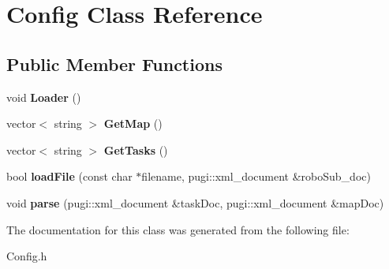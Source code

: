 \hypertarget{classConfig}{\section{\-Config \-Class \-Reference}
\label{classConfig}
}
\subsection*{\-Public \-Member \-Functions}
\begin{DoxyCompactItemize}
\item 
\hypertarget{classConfig_acb243f0e74640367bc098a4d5801cbf8}{void {\bfseries \-Loader} ()}\label{classConfig_acb243f0e74640367bc098a4d5801cbf8}

\item 
\hypertarget{classConfig_a0a83a861c14feba0f3f44f3b59f316a2}{vector$<$ string $>$ {\bfseries \-Get\-Map} ()}\label{classConfig_a0a83a861c14feba0f3f44f3b59f316a2}

\item 
\hypertarget{classConfig_ac7d1ca3f46f6ebe7509d3653f84a27b1}{vector$<$ string $>$ {\bfseries \-Get\-Tasks} ()}\label{classConfig_ac7d1ca3f46f6ebe7509d3653f84a27b1}

\item 
\hypertarget{classConfig_acebf7a356b3bf39080c194e5b27ee5e1}{bool {\bfseries load\-File} (const char $\ast$filename, pugi\-::xml\-\_\-document \&robo\-Sub\-\_\-doc)}\label{classConfig_acebf7a356b3bf39080c194e5b27ee5e1}

\item 
\hypertarget{classConfig_a23b2ac926ac65fbab2266e8c3183b77e}{void {\bfseries parse} (pugi\-::xml\-\_\-document \&task\-Doc, pugi\-::xml\-\_\-document \&map\-Doc)}\label{classConfig_a23b2ac926ac65fbab2266e8c3183b77e}

\end{DoxyCompactItemize}


\-The documentation for this class was generated from the following file\-:\begin{DoxyCompactItemize}
\item 
\-Config.\-h\end{DoxyCompactItemize}

